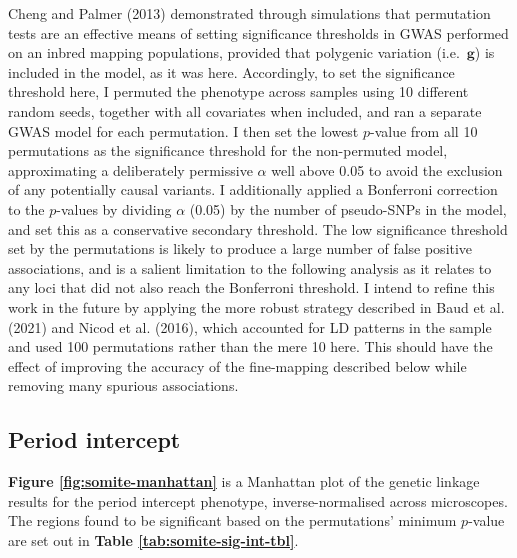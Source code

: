 \documentclass[
]{book}
\begin{document}
Cheng and Palmer (2013) demonstrated through simulations that permutation tests are an effective means of setting significance thresholds in GWAS performed on an inbred mapping populations, provided that polygenic variation (i.e.~\(\pmb{g}\)) is included in the model, as it was here. Accordingly, to set the significance threshold here, I permuted the phenotype across samples using 10 different random seeds, together with all covariates when included, and ran a separate GWAS model for each permutation. I then set the lowest \(p\)-value from all 10 permutations as the significance threshold for the non-permuted model, approximating a deliberately permissive \(\alpha\) well above 0.05 to avoid the exclusion of any potentially causal variants. I additionally applied a Bonferroni correction to the \(p\)-values by dividing \(\alpha\) (0.05) by the number of pseudo-SNPs in the model, and set this as a conservative secondary threshold. The low significance threshold set by the permutations is likely to produce a large number of false positive associations, and is a salient limitation to the following analysis as it relates to any loci that did not also reach the Bonferroni threshold. I intend to refine this work in the future by applying the more robust strategy described in Baud et al. (2021) and Nicod et al. (2016), which accounted for LD patterns in the sample and used 100 permutations rather than the mere 10 here. This should have the effect of improving the accuracy of the fine-mapping described below while removing many spurious associations.

\hypertarget{period-intercept}{%
\subsection{Period intercept}\label{period-intercept}}

\textbf{Figure \ref{fig:somite-manhattan}} is a Manhattan plot of the genetic linkage results for the period intercept phenotype, inverse-normalised across microscopes. The regions found to be significant based on the permutations' minimum \(p\)-value are set out in \textbf{Table \ref{tab:somite-sig-int-tbl}}.
\end{document}
